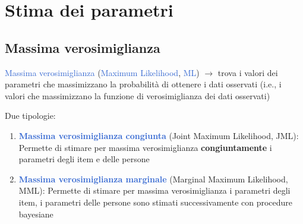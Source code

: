 \documentclass[
  ignorenonframetext,
]{beamer}
\begin{document}
\hypertarget{stima-dei-parametri}{%
\section{Stima dei parametri}\label{stima-dei-parametri}}

\hypertarget{massima-verosimiglianza}{%
\subsection{Massima verosimiglianza}\label{massima-verosimiglianza}}

\begin{frame}{}
\protect\hypertarget{section-4}{}
\textcolor{highlight}{Massima verosimiglianza}
(\textcolor{highlight}{Maximum Likelihood}, \textcolor{highlight}{ML})
\(\rightarrow\) trova i valori dei parametri che massimizzano la
probabilità di ottenere i dati osservati (i.e., i valori che
massimizzano la funzione di verosimiglianza dei dati osservati)

Due tipologie:

\begin{enumerate}
\item
  \textcolor{highlight}{\textbf{Massima verosimiglianza congiunta}}
  (Joint Maximum Likelihood, JML): Permette di stimare per massima
  verosimiglianza \textbf{congiuntamente} i parametri degli item e delle
  persone
\item
  \textcolor{highlight}{\textbf{Massima verosimiglianza marginale}}
  (Marginal Maximum Likelihood, MML): Permette di stimare per massima
  verosimiglianza i parametri degli item, i parametri delle persone sono
  stimati successivamente con procedure bayesiane
\end{enumerate}
\end{frame}
\end{document}

